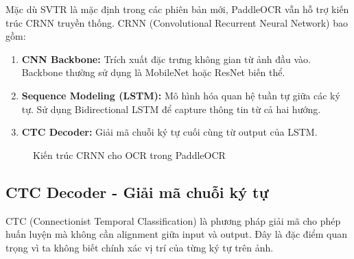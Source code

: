 Mặc dù SVTR là mặc định trong các phiên bản mới, PaddleOCR vẫn hỗ trợ kiến trúc CRNN truyền thống. CRNN (Convolutional Recurrent Neural Network) bao gồm:

\begin{enumerate}
    \item \textbf{CNN Backbone:} Trích xuất đặc trưng không gian từ ảnh đầu vào. Backbone thường sử dụng là MobileNet hoặc ResNet biến thể.
    \item \textbf{Sequence Modeling (LSTM):} Mô hình hóa quan hệ tuần tự giữa các ký tự. Sử dụng Bidirectional LSTM để capture thông tin từ cả hai hướng.
    \item \textbf{CTC Decoder:} Giải mã chuỗi ký tự cuối cùng từ output của LSTM.
\end{enumerate}

\begin{figure}[!htbp]
    \centering
    \caption{Kiến trúc CRNN cho OCR trong PaddleOCR}
    \label{fig:crnn_arch}
\end{figure}

\subsection{CTC Decoder - Giải mã chuỗi ký tự}

CTC (Connectionist Temporal Classification) là phương pháp giải mã cho phép huấn luyện mà không cần alignment giữa input và output. Đây là đặc điểm quan trọng vì ta không biết chính xác vị trí của từng ký tự trên ảnh.

